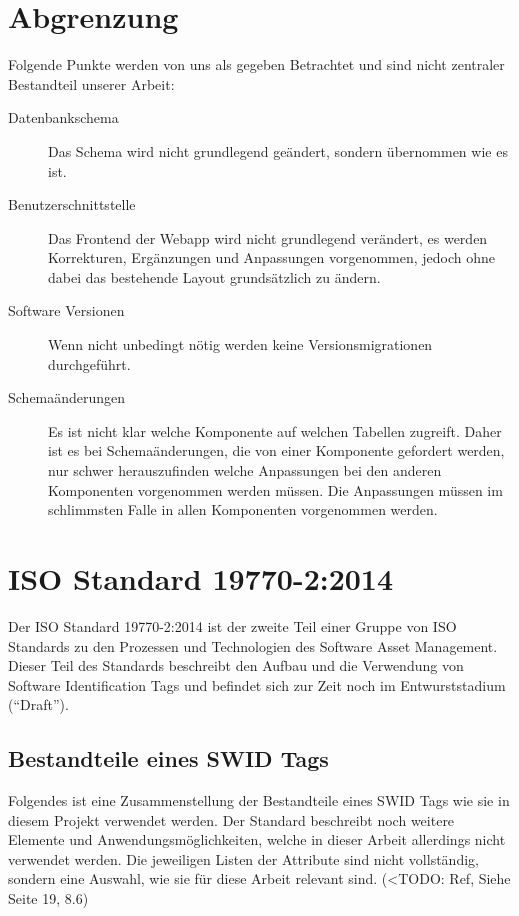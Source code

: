 \section{Abgrenzung}
Folgende Punkte werden von uns als gegeben Betrachtet und sind nicht zentraler
Bestandteil unserer Arbeit:

\begin{description}
	\item[Datenbankschema] Das Schema wird nicht grundlegend
	geändert, sondern übernommen wie es ist.

	\item[Benutzerschnittstelle] Das Frontend der Webapp wird nicht grundlegend
	verändert, es werden Korrekturen, Ergänzungen und Anpassungen vorgenommen,
	jedoch ohne dabei das bestehende Layout grundsätzlich zu ändern.

	\item[Software Versionen] Wenn nicht unbedingt nötig werden keine
	Versionsmigrationen durchgeführt.

	\item[Schemaänderungen] Es ist nicht klar welche Komponente auf welchen
	Tabellen zugreift. Daher ist es bei Schemaänderungen, die von einer Komponente
	gefordert werden, nur schwer herauszufinden welche Anpassungen bei den anderen
	Komponenten vorgenommen werden müssen. Die Anpassungen müssen im schlimmsten
	Falle in allen Komponenten vorgenommen werden.
\end{description}

\section{ISO Standard 19770-2:2014} 
Der ISO Standard 19770-2:2014 ist der zweite Teil einer Gruppe von ISO Standards
zu den Prozessen und Technologien des Software Asset Management. Dieser Teil des
Standards beschreibt den Aufbau und die Verwendung von Software Identification
Tags und befindet sich zur Zeit noch im Entwurststadium (\enquote{Draft}).

\subsection{Bestandteile eines SWID Tags}
Folgendes ist eine Zusammenstellung der Bestandteile eines SWID Tags wie sie in
diesem Projekt verwendet werden. Der Standard beschreibt noch weitere Elemente
und Anwendungsmöglichkeiten, welche in dieser Arbeit allerdings nicht verwendet
werden. Die jeweiligen Listen der Attribute sind nicht vollständig, sondern eine
Auswahl, wie sie für diese Arbeit relevant sind. (<TODO: Ref, Siehe Seite 19, 8.6)

